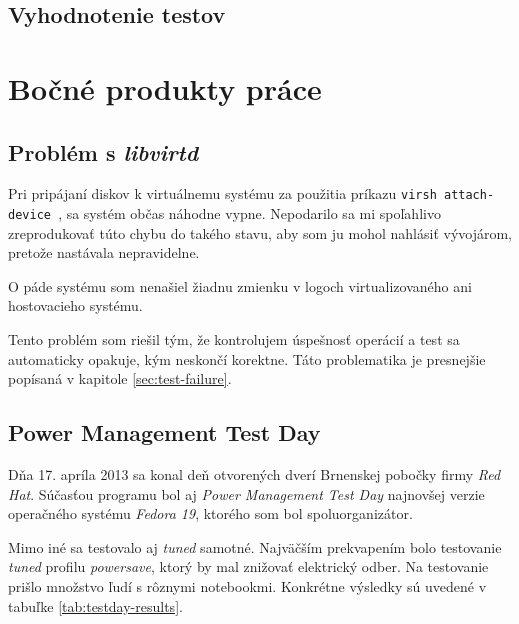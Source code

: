 %
%

\section{Vyhodnotenie testov}


%
%

\chapter{Bočné produkty práce}

%
%

\section{Problém s \emph{libvirtd}}
\label{sec:libvirt-problem}

Pri pripájaní diskov k virtuálnemu systému za použitia príkazu \texttt{virsh
attach-device }, sa systém občas náhodne vypne. Nepodarilo sa mi spoľahlivo
zreprodukovať túto chybu do takého stavu, aby som ju mohol nahlásiť vývojárom,
pretože nastávala nepravidelne. 

O páde systému som nenašiel žiadnu zmienku v logoch virtualizovaného ani
hostovacieho systému. 

Tento problém som riešil tým, že kontrolujem úspešnosť operácií a test sa
automaticky opakuje, kým neskončí korektne. Táto problematika je presnejšie
popísaná v kapitole \ref{sec:test-failure}.

%
%

\section{Power Management Test Day}

Dňa 17. apríla 2013 sa konal deň otvorených dverí Brnenskej pobočky firmy
\emph{Red Hat}. Súčasťou programu bol aj \emph{Power Management Test Day}
najnovšej verzie operačného systému \emph{Fedora 19}, ktorého som bol
spoluorganizátor. 

Mimo iné sa testovalo aj \emph{tuned} samotné. Najväčším prekvapením bolo
testovanie \emph{tuned} profilu \emph{powersave}, ktorý by mal znižovať
elektrický odber. Na testovanie prišlo množstvo ľudí s rôznymi notebookmi.
Konkrétne výsledky sú uvedené v tabuľke \ref{tab:testday-results}.

